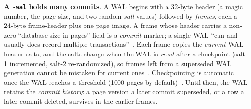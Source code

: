 \documentclass[10pt,a4paper]{article}
\newcommand{\code}[1]{\texttt{#1}}
\begin{document}
\begin{fnote}\small
\textbf{A \code{-wal} holds many commits.} A WAL begins with a 32-byte header (a
magic number, the page size, and two random \emph{salt} values) followed by
\emph{frames}, each a 24-byte frame-header plus one page image. A frame whose
header carries a non-zero ``database size in pages'' field is a \emph{commit}
marker; a single WAL ``can and usually does record multiple
transactions''~\cite{sqlite_wal}. Each frame copies the \emph{current} WAL-header
salts, and the salts change when the WAL is \emph{reset} after a checkpoint (salt-1
incremented, salt-2 re-randomized), so frames left from a superseded WAL generation
cannot be mistaken for current ones~\cite{sqlite_fileformat}. Checkpointing is
automatic once the WAL reaches a threshold (1000 pages by default)~\cite{sqlite_wal}.
Until then, the WAL retains the \emph{commit history}: a page version a later commit
superseded, or a row a later commit deleted, survives in the earlier frames.
\end{fnote}
\end{document}
